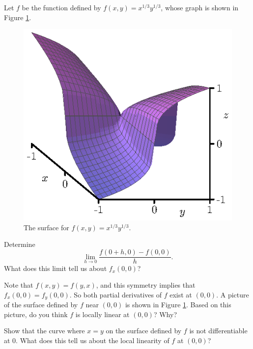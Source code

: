 \begin{exercises} 

\item \label{Ez:10.4.0}   Let $f$ be the function defined by $f(x,y) = x^{1/3}y^{1/3}$, whose graph is shown in Figure \ref{F:10.4.Not_diff}.
\begin{figure}[h]
\begin{center}
  \includegraphics{figures/fig_10_4_not_diff.eps}
\end{center}
\caption{The surface for $f(x,y) = x^{1/3}y^{1/3}$.}
\label{F:10.4.Not_diff}
\end{figure}
    \ba
    \item Determine
    \[\lim_{h \to 0} \frac{f(0+h,0)-f(0,0)}{h}.\]
    What does this limit tell us about $f_x(0,0)$?

    \item Note that $f(x,y)=f(y,x)$, and this symmetry implies that $f_x(0,0) = f_y(0,0)$. So both partial derivatives of $f$ exist at $(0,0)$. A picture of the surface defined by $f$ near $(0,0)$ is shown in Figure \ref{F:10.4.Not_diff}. Based on this picture, do you think $f$ is locally linear at $(0,0)$? Why?


    \item Show that the curve where $x=y$ on the surface defined by $f$ is not differentiable at 0. What does this tell us about the local linearity of $f$ at $(0,0)$?


\end{exercises}
